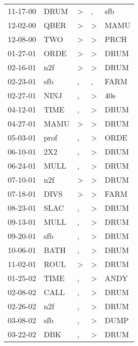 \begin{supertabular}{lllll}
 11-17-00 &   DRUM &     \textgreater &                , &    sfb \\
 12-02-00 &   QBER &     \textgreater &     \textgreater &   MAMU \\
 12-08-00 &    TWO &     \textgreater &     \textgreater &   PRCH \\
 01-27-01 &   ORDE &     \textgreater &     \textgreater &   DRUM \\
 02-16-01 &    n2f &     \textgreater &     \textgreater &   DRUM \\
 02-23-01 &    sfb &                , &                , &   FARM \\
 02-27-01 &   NINJ &                , &     \textgreater &    40s \\
 04-12-01 &   TIME &                , &     \textgreater &   DRUM \\
 04-27-01 &   MAMU &     \textgreater &     \textgreater &   DRUM \\
 05-03-01 &   prof &                , &     \textgreater &   ORDE \\
 06-10-01 &    2X2 &                , &     \textgreater &   DRUM \\
 06-24-01 &   MULL &                , &     \textgreater &   DRUM \\
 07-10-01 &    n2f &     \textgreater &     \textgreater &   DRUM \\
 07-18-01 &   DIVS &     \textgreater &     \textgreater &   FARM \\
 08-23-01 &   SLAC &                , &     \textgreater &   DRUM \\
 09-13-01 &   MULL &                , &     \textgreater &   DRUM \\
 09-20-01 &    sfb &                , &     \textgreater &   DRUM \\
 10-06-01 &   BATH &                , &     \textgreater &   DRUM \\
 11-02-01 &   ROUL &     \textgreater &     \textgreater &   DRUM \\
 01-25-02 &   TIME &                , &     \textgreater &   ANDY \\
 02-08-02 &   CALL &                , &     \textgreater &   DRUM \\
 02-26-02 &    n2f &                , &     \textgreater &   DRUM \\
 03-08-02 &    sfb &                , &     \textgreater &   DUMP \\
 03-22-02 &    DBK &                , &     \textgreater &   DRUM \\

\end{supertabular}
